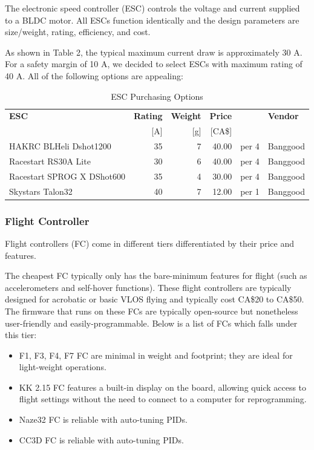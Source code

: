 The electronic speed controller (ESC) controls the voltage and current supplied to a BLDC motor. All ESCs 
function identically and the design parameters are size/weight, rating, efficiency, and cost.

As shown in Table 2, the typical maximum current draw is approximately 30 A. For a 
safety margin of 10 A, we decided to select ESCs with maximum rating of 40 A. All of the following options are appealing:

\begin{table}[H]
    \centering
    \caption{ESC Purchasing Options}
    \label{table:esc-table}

    \begin{tabular}{lrrrll}

    \hline
    \textbf{ESC} & \textbf{Rating} & \textbf{Weight} & \textbf{Price}  & & \textbf{Vendor}\\
    & [A] & [g] & [CA\$] & & \\
    \hline
    HAKRC BLHeli Dshot1200 & 35 & 7  & 40.00 & per 4 & Banggood\\
    Racestart RS30A Lite & 30 & 6  & 40.00 & per 4 & Banggood\\
    Racestart SPROG X DShot600 & 35 & 4  & 30.00 & per 4 & Banggood\\
    Skystars Talon32 & 40 & 7  & 12.00 & per 1 & Banggood\\
    \hline

    \end{tabular} 
\end{table}

\subsubsection{Flight Controller}

Flight controllers (FC) come in different tiers differentiated by their price and features. 

The cheapest FC typically only has the bare-minimum features for flight (such as accelerometers and 
self-hover functions). These flight controllers are typically designed for acrobatic or basic VLOS 
flying and typically cost CA\$20 to CA\$50. The firmware that runs on these FCs are typically 
open-source but nonetheless user-friendly and easily-programmable. Below is a list of FCs which falls 
under this tier:

\begin{itemize}[noitemsep,topsep=0pt, parsep=4pt, partopsep=0pt]
    \item F1, F3, F4, F7 FC are minimal in weight and footprint; they are ideal for light-weight operations.\cite{f1fc}
    \item KK 2.15 FC features a built-in display on the board, allowing quick access to flight settings without the need to connect to a computer for reprogramming.
    \item Naze32 FC is reliable with auto-tuning PIDs.
    \item CC3D FC is reliable with auto-tuning PIDs.
\end{itemize}

